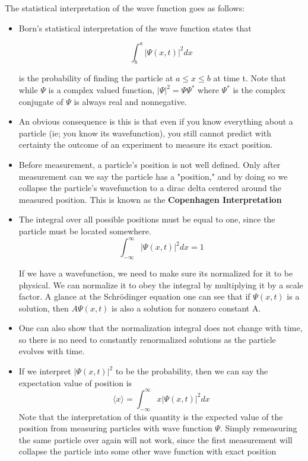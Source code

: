 \documentclass[11pt]{article}
\begin{document}
\noindent The statistical interpretation of the wave function goes as follows:
\begin{itemize}
    \item Born's statistical interpretation of the wave function states that 
    
    \[ 
        \int^{a}_{b} |\Psi(x,t)|^{2}dx  
    \]

    is the probability of finding the particle at \( a \leq x \leq b \) at time t. Note that while \( \Psi \) is a complex valued
    function, \( |\Psi|^{2} = \Psi \Psi^{*}\) where \( \Psi^{*} \) is the complex conjugate of \( \Psi \) is always real and nonnegative.

    \item An obvious consequence is this is that even if you know everything about a particle (ie; you know its wavefunction), you still
    cannot predict with certainty the outcome of an experiment to measure its exact position. 

    \item Before measurement, a particle's position is not well defined. Only after measurement can we say the particle has a "position," and
    by doing so we collapse the particle's wavefunction to a dirac delta centered around the measured position. This is known as the\textbf{
    Copenhagen Interpretation}

    \item The integral over all possible positions must be equal to one, since the particle must be located somewhere.
    \[ 
        \int^{\infty}_{-\infty} |\Psi(x,t)|^{2}dx = 1
    \]

    If we have a wavefunction, we need to make sure its normalized for it to be physical. We can normalize it to obey the integral by multiplying
    it by a scale factor. A glance at the Schr\"odinger equation one can see that if \( \Psi(x,t) \) is a solution, then \( A\Psi(x,t) \) is also
    a solution for nonzero constant A.

    \item One can also show that the normalization integral does not change with time, so there is no need to constantly renormalized solutions as 
    the particle evolves with time.

    \item If we interpret \( |\Psi(x,t)|^{2} \) to be the probability, then we can say the expectation value of position is 
    \[ 
        \langle x \rangle = \int^{\infty}_{-\infty} x|\Psi(x,t)|^{2}dx
    \]
    Note that the interpretation of this quantity is the expected value of the position from measuring particles with wave function \( \Psi \). Simply
    remeasuring the same particle over again will not work, since the first measurement will collapse the particle into some other wave function with
    exact position


\end{itemize}
\end{document}
